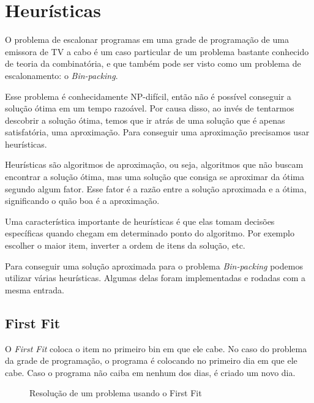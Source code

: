 \section{Heurísticas}


O problema de escalonar programas em uma grade de programação de uma emissora de TV a cabo é um caso
particular de um problema bastante conhecido de teoria da combinatória, e que também pode ser visto
como um problema de escalonamento: o \textit{Bin-packing}.

Esse problema é conhecidamente NP-difícil, então não é possível conseguir a solução ótima em um tempo
razoável. Por causa disso, ao invés de tentarmos descobrir a solução ótima, temos que ir atrás de uma
solução que é apenas satisfatória, uma aproximação. Para conseguir uma aproximação precisamos usar
heurísticas.

Heurísticas são algoritmos de aproximação, ou seja, algoritmos que não buscam encontrar a solução ótima,
mas uma solução que consiga se aproximar da ótima segundo algum fator. Esse fator é a razão entre
a solução aproximada e a ótima, significando o quão boa é a aproximação.

Uma característica importante de heurísticas é que elas tomam decisões específicas quando chegam em determinado
ponto do algoritmo. Por exemplo escolher o maior item, inverter a ordem de itens da solução, etc.

Para conseguir uma solução aproximada para o problema \textit{Bin-packing} podemos utilizar várias heurísticas.
Algumas delas foram implementadas e rodadas com a mesma entrada.

\subsection{First Fit}

O \textit{First Fit} coloca o item no primeiro bin em que ele cabe. No caso do problema da grade de programação,
o programa é colocando no primeiro dia em que ele cabe. Caso o programa não caiba em nenhum dos dias, é criado
um novo dia.

\begin{figure}[H]
  \centering
  \caption{Resolução de um problema usando o First Fit}
\end{figure}

